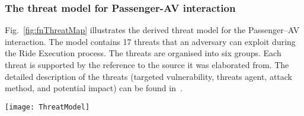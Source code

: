 \documentclass[manuscript]{acmart}
\begin{document}
\subsubsection{The threat model for Passenger-AV interaction} 

Fig.~\ref{fig:fnThreatMap} illustrates the derived threat model for the Passenger--AV interaction. The model contains 17 threats that an adversary can exploit during the Ride Execution process. The threats are organised into six groups. Each threat is supported by the reference to the source it was elaborated from. The detailed description of the threats (targeted vulnerability, threats agent, attack method, and potential impact) can be found in~\cite{PassengerDataProtection}.

\begin{figure*} [h]
    \centering
    \texttt{[image: ThreatModel]}
    \caption{The threat model for the Passenger--AV interaction~\cite{PassengerDataProtection}} \label{fig:fnThreatMap}
\end{figure*}
\end{document}
